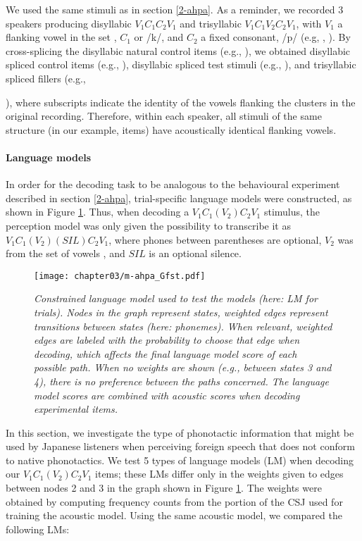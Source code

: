 We used the same stimuli as in section \ref{2-ahpa}. As a reminder, we recorded 3 speakers producing disyllabic $V_{1}C_{1}C_{2}V_{1}$ and trisyllabic $V_{1}C_{1}V_{2}C_{2}V_{1}$, with $V_{1}$ a flanking vowel in the set , $C_{1}$  or /k/, and $C_{2}$ a fixed consonant, /p/ (e.g, , ). By cross-splicing the disyllabic natural control items (e.g., ), we obtained disyllabic spliced control items (e.g., \texorpdfstring{}{}), disyllabic spliced test stimuli (e.g., \texorpdfstring{}{}), and trisyllabic spliced fillers (e.g., {), where subscripts indicate the identity of the vowels flanking the clusters in the original recording. Therefore, within each speaker, all stimuli of the same structure (in our example,  items) have acoustically identical flanking vowels.
  
\paragraph{Language models}
In order for the decoding task to be analogous to the behavioural experiment described in section \ref{2-ahpa}, trial-specific language models were constructed, as shown in Figure \ref{fig:m-ahpa_G}. Thus, when decoding a $V_{1}C_{1}(V_{2})C_{2}V_{1}$ stimulus, the perception model was only given the possibility to transcribe it as $V_{1}C_{1}(V_{2})(SIL)C_{2}V_{1}$, where phones between parentheses are optional, $V_{2}$ was from the set of vowels , and $SIL$ is an optional silence. 

\begin{figure}[htb]
    \centering
    \texttt{[image: chapter03/m-ahpa\_Gfst.pdf]}
    \caption{\textit{Constrained language model used to test the models (here: LM for  trials). Nodes in the graph represent states, weighted edges represent transitions between states (here: phonemes). When relevant, weighted edges are labeled with the probability to choose that edge when decoding, which affects the final language model score of each possible path. When no weights are shown (e.g., between states 3 and 4), there is no preference between the paths concerned. The language model scores are combined with acoustic scores when decoding experimental items.}}
    \label{fig:m-ahpa_G}
\end{figure}

In this section, we investigate the type of phonotactic information that might be used by Japanese listeners when perceiving foreign speech that does not conform to native phonotactics. We test 5 types of language models (LM) when decoding our $V_{1}C_{1}(V_{2})C_{2}V_{1}$ items; these LMs differ only in the weights given to edges between nodes 2 and 3 in the graph shown in Figure \ref{fig:m-ahpa_G}. The weights were obtained by computing frequency counts from the portion of the CSJ used for training the acoustic model. Using the same acoustic model, we compared the following LMs: 

}
